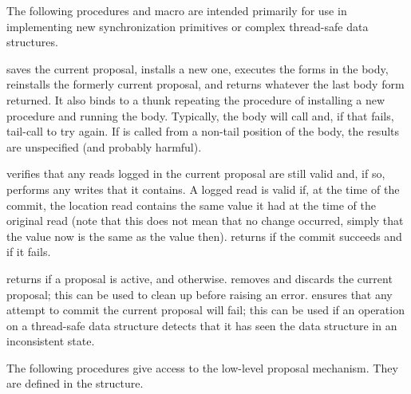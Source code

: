 The following procedures and macro are intended primarily for use in
 implementing new synchronization primitives or complex thread-safe data
 structures.
\begin{protos}
\end{protos}
\noindent
{} saves the current proposal, installs a new one,
 executes the forms in the body, reinstalls the formerly current proposal,
 and returns whatever the last body form returned.
It also binds  to a thunk repeating the procedure of installing
 a new procedure and running the body.
Typically, the body will call  and, if that fails,
 tail-call  to try again.
If  is called from a non-tail position of the body, the results
 are unspecified (and probably harmful).

 verifies that any reads logged in the current proposal are
 still valid and, if so, performs any writes that it contains.
A logged read is valid if, at the time of the commit, the location read contains
 the same value it had at the time of the original read (note that this does
 not mean that no change occurred, simply that the value now is the same as
 the value then).
 returns  if the commit succeeds and 
 if it fails.

 returns  if a proposal is active, and
  otherwise.
 removes and discards the current proposal;
 this can be used to clean up before raising an error.
 ensures that any attempt to commit the
 current proposal will fail; this can be used if an operation on a
 thread-safe data structure detects that it has seen the data structure in an
 inconsistent state.



The following procedures give access to the low-level proposal
mechanism.  They are defined in the  structure.
\begin{protos}
\end{protos}
\noindent

